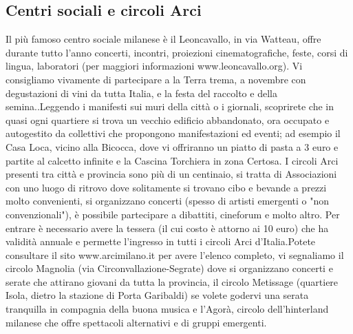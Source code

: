 \subsection{Centri sociali e circoli Arci}
Il più famoso centro sociale milanese è il Leoncavallo, in via Watteau, offre durante tutto l'anno concerti, incontri, proiezioni cinematografiche, feste, corsi di lingua, laboratori (per maggiori informazioni www.leoncavallo.org). Vi consigliamo vivamente di partecipare a la Terra trema, a novembre con degustazioni di vini da tutta Italia, e la festa del raccolto e della semina..Leggendo i manifesti sui muri della città o i giornali, scoprirete che in quasi ogni quartiere si trova un vecchio edificio abbandonato, ora occupato e autogestito da collettivi che propongono manifestazioni ed eventi; ad esempio il Casa Loca, vicino alla Bicocca, dove vi offriranno un piatto di pasta a 3 euro e partite al calcetto infinite e la Cascina Torchiera in zona Certosa.
I circoli Arci presenti tra città e provincia sono più di un centinaio, si tratta di Associazioni con uno luogo di ritrovo dove solitamente si trovano cibo e bevande a prezzi molto convenienti, si organizzano concerti (spesso di artisti emergenti o "non convenzionali"), è possibile partecipare a dibattiti, cineforum e molto altro. 
Per entrare è necessario avere la tessera (il cui costo è attorno ai 10 euro) che ha validità annuale e permette l'ingresso in tutti i circoli Arci d'Italia.Potete consultare il sito www.arcimilano.it per avere l'elenco completo, vi segnaliamo il circolo Magnolia (via Circonvallazione-Segrate) dove si organizzano concerti e serate che attirano giovani da tutta la provincia, il circolo Metissage (quartiere Isola, dietro la stazione di Porta Garibaldi) se volete godervi una serata tranquilla in compagnia della buona musica e l'Agorà, circolo dell'hinterland milanese che offre spettacoli alternativi e di gruppi emergenti.  

